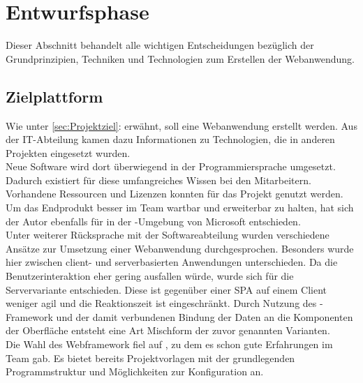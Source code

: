 \section{Entwurfsphase} 
\label{sec:Entwurfsphase}
Dieser Abschnitt behandelt alle wichtigen Entscheidungen bezüglich der Grundprinzipien, Techniken und Technologien zum
Erstellen der Webanwendung.

\subsection{Zielplattform}
\label{sec:Zielplattform}
Wie unter \ref{sec:Projektziel}:  erwähnt, 
soll eine Webanwendung erstellt werden. Aus der IT-Abteilung kamen dazu Informationen zu  
Technologien, die in anderen Projekten eingesetzt wurden.\\
Neue Software wird dort überwiegend in der Programmiersprache  umgesetzt. 
Dadurch existiert für diese umfangreiches Wissen bei den Mitarbeitern.
Vorhandene Ressourcen und Lizenzen konnten für das Projekt genutzt werden.
Um das Endprodukt besser im Team wartbar und erweiterbar zu halten, hat sich der Autor 
ebenfalls für  in der -Umgebung von Microsoft entschieden.\\
Unter weiterer Rücksprache mit der Softwareabteilung wurden verschiedene Ansätze zur
Umsetzung einer Webanwendung durchgesprochen. Besonders wurde hier zwischen client- und serverbasierten
Anwendungen unterschieden. Da die Benutzerinteraktion eher gering ausfallen würde, wurde sich
für die Servervariante entschieden. Diese ist gegenüber einer \ac{SPA} auf einem Client weniger agil und die 
Reaktionszeit ist eingeschränkt. Durch Nutzung des -Framework und der damit
verbundenen Bindung der Daten an die Komponenten der Oberfläche entsteht eine Art Mischform der zuvor genannten Varianten.\\
Die Wahl des Webframework fiel auf , zu dem es schon gute Erfahrungen im Team gab.
Es bietet bereits Projektvorlagen mit der grundlegenden Programmstruktur und Möglichkeiten zur
Konfiguration an. 

